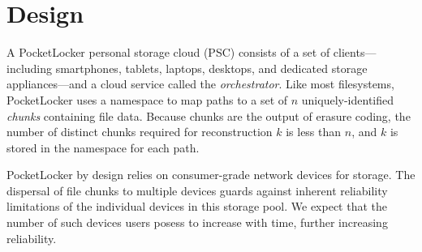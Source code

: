 
\section{Design}
\label{sec-design}

A PocketLocker personal storage cloud (PSC) consists of a set of
clients---including smartphones, tablets, laptops, desktops, and dedicated
storage appliances---and a cloud service called the \textit{orchestrator}.
Like most filesystems, PocketLocker uses a namespace to map paths to a set of
$n$ uniquely-identified \textit{chunks} containing file data. Because chunks
are the output of erasure coding, the number of distinct chunks required for
reconstruction $k$ is less than $n$, and $k$ is stored in the namespace for
each path.

PocketLocker by design relies on consumer-grade network devices for storage.
The dispersal of file chunks to multiple devices guards against inherent
reliability limitations of the individual devices in this storage pool. We
expect that the number of such devices users posess to increase with time,
further increasing reliability.


